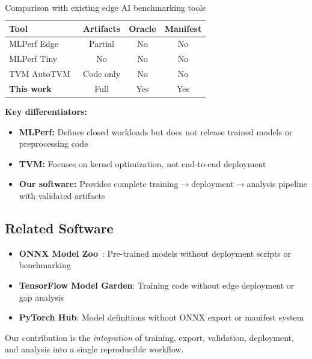 \documentclass[review]{elsarticle}
\begin{document}
\begin{table}[h]
\centering
\caption{Comparison with existing edge AI benchmarking tools}
\label{tab:tool-comparison}
\small
\begin{tabular}{lccc}
\toprule
\textbf{Tool} & \textbf{Artifacts} & \textbf{Oracle} & \textbf{Manifest} \\
\midrule
MLPerf Edge~\cite{mlperf_edge} & Partial & No & No \\
MLPerf Tiny~\cite{mlperf_tiny_neurips} & No & No & No \\
TVM AutoTVM~\cite{tvm_osdi18} & Code only & No & No \\
\textbf{This work} & Full & Yes & Yes \\
\bottomrule
\end{tabular}
\end{table}

\textbf{Key differentiators:}

\begin{itemize}
\item \textbf{MLPerf:} Defines closed workloads but does not release trained models or preprocessing code
\item \textbf{TVM:} Focuses on kernel optimization, not end-to-end deployment
\item \textbf{Our software:} Provides complete training$\rightarrow$deployment$\rightarrow$analysis pipeline with validated artifacts
\end{itemize}

\subsection{Related Software}

\begin{itemize}
\item \textbf{ONNX Model Zoo}~\cite{onnxruntime_docs}: Pre-trained models without deployment scripts or benchmarking
\item \textbf{TensorFlow Model Garden}: Training code without edge deployment or gap analysis
\item \textbf{PyTorch Hub}: Model definitions without ONNX export or manifest system
\end{itemize}

Our contribution is the \emph{integration} of training, export, validation, deployment, and analysis into a single reproducible workflow.

\end{document}
